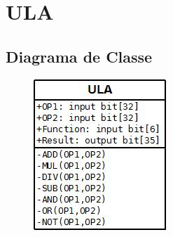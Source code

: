 \documentclass{report}
\begin{document}
  \section{ULA}

    \subsection{Diagrama de Classe}
  \begin{figure}[H]
     	\centering
     	\includegraphics[scale=1.5]{./pictures/diagrams/ula.jpeg}
  \end{figure}      
     
\end{document}
